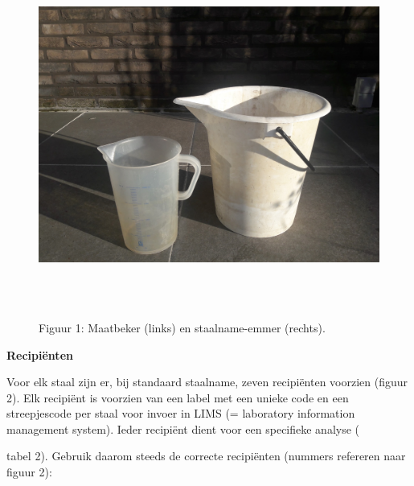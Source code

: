 \documentclass[
]{scrreprt}
\begin{document}
\begin{figure}
\centering
\includegraphics[width=6.29966in,height=4.72222in]{./media/image1.jpg}
\caption{Figuur 1: Maatbeker (links) en staalname-emmer (rechts).}
\end{figure}

\textbf{Recipiënten}

Voor elk staal zijn er, bij standaard staalname, zeven recipiënten voorzien (figuur 2). Elk recipiënt is voorzien van een label met een unieke code en een streepjescode per staal voor invoer in LIMS (= laboratory information management system). Ieder recipiënt dient voor een specifieke analyse (

tabel 2). Gebruik daarom steeds de correcte recipiënten (nummers refereren naar figuur 2):
\end{document}
